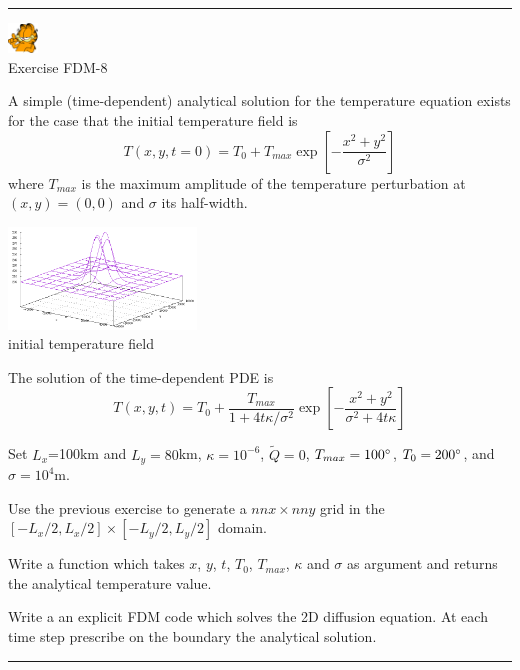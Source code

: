 \begin{center}
\begin{minipage}[t]{0.77\textwidth}
\par\noindent\rule{\textwidth}{0.4pt}
\begin{center}
\includegraphics[width=0.8cm]{images/garftr} \\
{\color{orange}Exercise FDM-8}
\end{center}

A simple (time-dependent) analytical solution for the temperature equation exists for 
the case that the initial temperature field is
\begin{equation}
T(x,y,t=0) = T_0+ T_{max} \exp \left[ -\frac{x^2+y^2}{\sigma^2}   \right]
\end{equation}
where $T_{max}$ is the maximum amplitude of the temperature perturbation 
at $(x,y) = (0, 0)$ and $\sigma$ its half-width. 

\begin{center}
\includegraphics[width=5cm]{images/fdm/gaussian}\\
{\captionfont initial temperature field}
\end{center}

The solution of the time-dependent PDE is
\begin{equation}
T(x,y,t)=T_0 + \frac{T_{max}}{1+4t\kappa/\sigma^2 } \exp \left[ -\frac{x^2+y^2}{\sigma^2 + 4t\kappa}   \right]
\end{equation}

Set $L_x$=100km and $L_y=80$km, $\kappa=10^{-6}$, $\tilde{Q}=0$, $T_{max}=100\degree$, $T_0=200\degree$, 
and $\sigma=10^4$m. 

Use the previous exercise to generate a $nnx\times nny$ grid 
in the $[-L_x/2,L_x/2]\times[-L_y/2,L_y/2]$ domain.

Write a function which takes $x$, $y$, $t$, $T_0$, $T_{max}$, $\kappa$ and $\sigma$ as argument 
and returns the analytical temperature value.

Write a an explicit FDM code which solves the 2D diffusion equation. At each time step 
prescribe on the boundary the analytical solution.  

\par\noindent\rule{\textwidth}{0.4pt}
\end{minipage}
\end{center}



